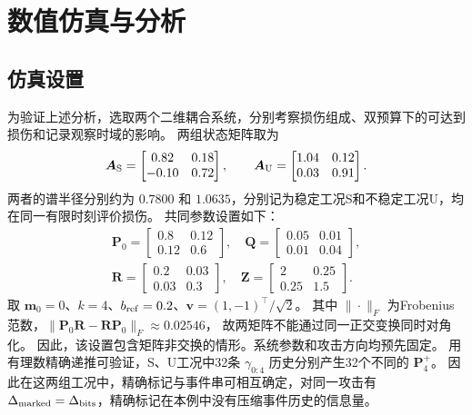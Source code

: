 \section{数值仿真与分析}
\label{sec:numerical}


\subsection{仿真设置}
为验证上述分析，选取两个二维耦合系统，分别考察损伤组成、双预算下的可达到损伤和记录观察时域的影响。
两组状态矩阵取为
\begin{equation}
 {\bm{A}}_{\rm S}=\begin{bmatrix}0.82&0.18\\-0.10&0.72\end{bmatrix},\qquad
 {\bm{A}}_{\rm U}=\begin{bmatrix}1.04&0.12\\0.03&0.91\end{bmatrix}.
\end{equation}
两者的谱半径分别约为 $0.7800$ 和 $1.0635$，分别记为稳定工况S和不稳定工况U，均在同一有限时刻评价损伤。
共同参数设置如下：
\begin{equation}
 \begin{gathered}
 {\bm{P}}_0=\begin{bmatrix}0.8&0.12\\0.12&0.6\end{bmatrix},\quad
 {\bm{Q}}=\begin{bmatrix}0.05&0.01\\0.01&0.04\end{bmatrix},\\
 {\bm{R}}=\begin{bmatrix}0.2&0.03\\0.03&0.3\end{bmatrix},\quad
 {\bm{Z}}=\begin{bmatrix}2&0.25\\0.25&1.5\end{bmatrix}.
\end{gathered}
 \label{eq:2d-parameters}
\end{equation}
取 ${\bm{m}}_0=0$、$k=4$、$b_{\rm ref}=0.2$、${\bm{v}}=(1,-1)^\top/\sqrt2$。
其中 $\|\cdot\|_F$ 为Frobenius范数，$\|{\bm{P}}_0{\bm{R}}-{\bm{R}}{\bm{P}}_0\|_F\approx0.02546$，
故两矩阵不能通过同一正交变换同时对角化。
因此，该设置包含矩阵非交换的情形。系统参数和攻击方向均预先固定。
用有理数精确递推可验证，S、U工况中32条 $\gamma_{0:4}$ 历史分别产生32个不同的 ${\bm{P}}_4^+$。
因此在这两组工况中，精确标记与事件串可相互确定，对同一攻击有
$\Delta_{\rm marked}=\Delta_{\rm bits}$，精确标记在本例中没有压缩事件历史的信息量。


